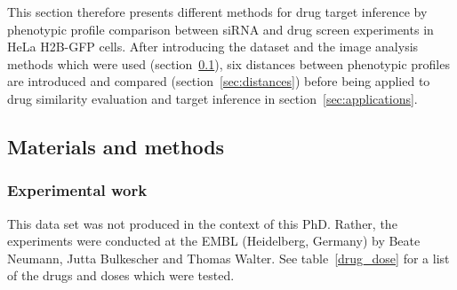 This section therefore presents different methods for drug target inference by phenotypic profile comparison between siRNA and drug screen experiments in HeLa H2B-GFP cells. After introducing the dataset and the image analysis methods which were used (section~\ref{sec:math_methods_ds}), six distances between phenotypic profiles are introduced and compared (section~\ref{sec:distances}) before being applied to drug similarity evaluation and target inference in section~\ref{sec:applications}.

\subsection{Materials and methods}
\label{sec:math_methods_ds}
\subsubsection{Experimental work}
This data set was not produced in the context of this PhD. Rather, the
experiments were conducted at the EMBL (Heidelberg, Germany) by Beate
Neumann, Jutta Bulkescher and Thomas Walter. See table~\ref{drug_dose} for a list of the drugs and doses which were tested.

